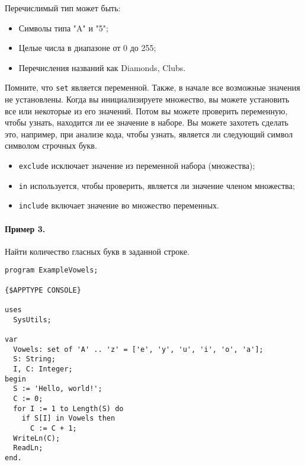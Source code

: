 \documentclass[12pt,a4paper]{report}
\begin{document}
Перечислимый тип может быть:
\begin{itemize}
\item Символы типа "A" и "5";
\item Целые числа в диапазоне от 0 до 255;
\item Перечисления названий как Diamonds, Clubs.
\end{itemize}

Помните, что \texttt{set} является переменной. Также, в начале все возможные значения не установлены. Когда вы инициализируете множество, вы можете установить все или некоторые из его значений. Потом вы можете проверить переменную, чтобы узнать, находится ли ее значение в наборе. Вы можете захотеть сделать это, например, при анализе кода, чтобы узнать, является ли следующий символ символом строчных букв.

\begin{itemize}
\item \texttt{exclude} исключает значение из переменной набора (множества);
\item \texttt{in} используется, чтобы проверить, является ли значение членом множества;
\item \texttt{include} включает значение во множество переменных.
\end{itemize}

\paragraph*{Пример 3.} Найти количество гласных букв в заданной строке.
\begin{verbatim}
program ExampleVowels;

{$APPTYPE CONSOLE}

uses
  SysUtils;

var
  Vowels: set of 'A' .. 'z' = ['e', 'y', 'u', 'i', 'o', 'a'];
  S: String;
  I, C: Integer;
begin
  S := 'Hello, world!';
  C := 0;
  for I := 1 to Length(S) do
    if S[I] in Vowels then
      C := C + 1;
  WriteLn(C);
  ReadLn;
end.
\end{verbatim}
\end{document}

